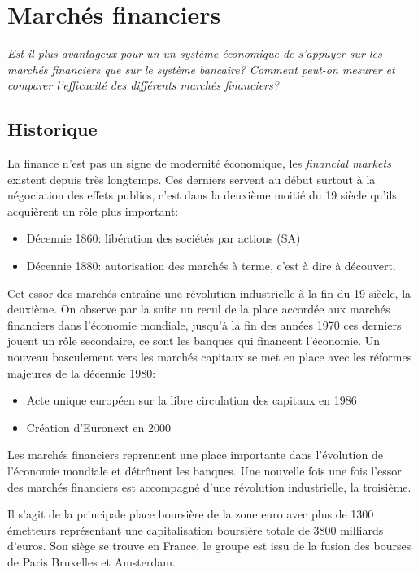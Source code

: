 \documentclass[main.tex]{subfiles}
\begin{document}
        
\chapter{Marchés financiers}

\textit{Est-il plus avantageux pour un un système économique de s'appuyer sur les marchés financiers que sur le système bancaire? Comment peut-on mesurer et comparer l'efficacité des différents marchés financiers?}

\section{Historique}

La finance n'est pas un signe de modernité économique, les \textit{financial markets} existent depuis très longtemps. Ces derniers servent au début surtout à la négociation des effets publics, c'est dans la deuxième moitié du 19 siècle qu'ils acquièrent un rôle plus important:
\begin{itemize}
        \item Décennie 1860: libération des sociétés par actions (SA)
        \item Décennie 1880: autorisation des marchés à terme, c'est à dire à découvert. 
\end{itemize}
Cet essor des marchés entraîne une révolution industrielle à la fin du 19 siècle, la deuxième. On observe par la suite un recul de la place accordée aux marchés financiers dans l'économie mondiale, jusqu'à la fin des années 1970 ces derniers jouent un rôle secondaire, ce sont les banques qui financent l'économie. Un nouveau basculement vers les marchés capitaux se met en place avec les réformes majeures de la décennie 1980:
\begin{itemize}
        \item Acte unique européen sur la libre circulation des capitaux en 1986 
        \item Création d'Euronext en 2000 
\end{itemize}
Les marchés financiers reprennent une place importante dans l'évolution de l'économie mondiale et détrônent les banques. Une nouvelle fois une fois l'essor des marchés financiers est accompagné d'une révolution industrielle, la troisième.

\begin{definition}[Euronext]
        Il s'agit de la principale place boursière de la zone euro avec plus de 1300 émetteurs représentant une capitalisation boursière totale de 3800 milliards d’euros. Son siège se trouve en France, le groupe est issu de la fusion des bourses de Paris Bruxelles et Amsterdam.
\end{definition}
\end{document}
